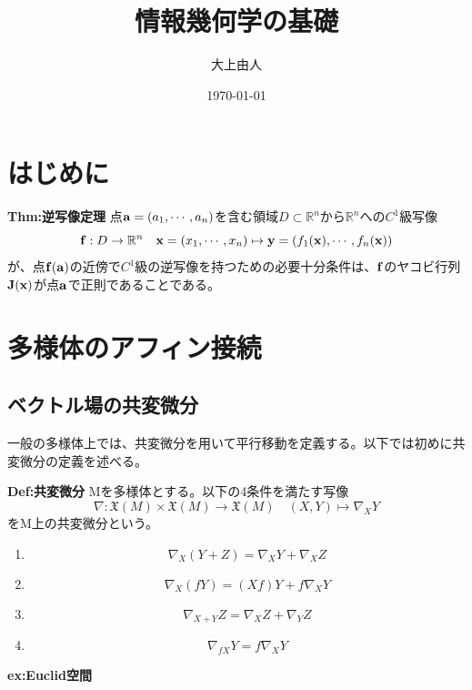 \documentclass[a4paper,11pt]{jsarticle}
\numberwithin{equation}{section}
\begin{document}
\title{情報幾何学の基礎}
\author{大上由人}
\date{\today}
\maketitle

\tableofcontents
\newpage

\section[0]{はじめに}
\begin{itembox}[l]{\textbf{Thm:逆写像定理}}
点$\vb{a}=(a_1,\cdots,a_n)$を含む領域$D \subset \mathbb{R}^n$から$\mathbb{R}^n$への$C^1$級写像
\begin{equation}
    \vb{f} : D \to \mathbb{R}^n \quad \vb{x} =(x_1,\cdots,x_n) \mapsto \vb{y} =(f_1(\vb{x}),\cdots,f_n(\vb{x}))
\end{equation}
が、点$\vb{f(a)}$の近傍で$C^1$級の逆写像を持つための必要十分条件は、$\vb{f}$のヤコビ行列$\vb{J}(\vb{x})$が点$\vb{a}$で正則であることである。

\end{itembox}
\section{多様体のアフィン接続}
\subsection{ベクトル場の共変微分}
一般の多様体上では、共変微分を用いて平行移動を定義する。以下では初めに共変微分の定義を述べる。

\begin{itembox}[l]{\textbf{Def:共変微分}}
    Mを多様体とする。以下の4条件を満たす写像
    \begin{equation}
        \nabla : \mathfrak{X}(M) \times \mathfrak{X}(M) \to \mathfrak{X}(M) \quad (X,Y) \mapsto \nabla_XY
    \end{equation}
    をM上の共変微分という。
    \begin{enumerate}
        \item 
        \begin{equation}
            \nabla_X(Y+Z) = \nabla_XY + \nabla_XZ
        \end{equation}

        \item
        \begin{equation}
            \nabla_X(fY) = (Xf)Y + f\nabla_XY
        \end{equation}

        \item
        \begin{equation}
            \nabla_{X+Y}Z = \nabla_XZ + \nabla_YZ
        \end{equation}

        \item
        \begin{equation}
            \nabla_{fX}Y = f\nabla_XY
        \end{equation}
    \end{enumerate}
\end{itembox}
\textbf{ex:Euclid空間}\\
\end{document}
